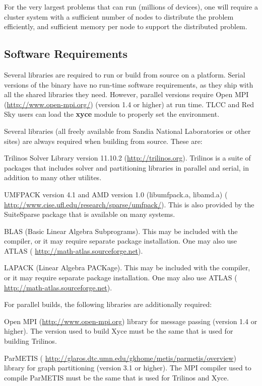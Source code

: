 \documentclass[11pt,report,strict]{SANDreport}
\begin{document}
For the very largest problems that \Xyce{} can run (millions of
devices), one will require a cluster system with a sufficient number
of nodes to distribute the problem efficiently, and sufficient memory
per node to support the distributed problem.  

\subsection{Software Requirements}
Several libraries are required to run \Xyce{} or build \Xyce{} from source on a
platform.  Serial versions of the \Xyce{} binary have no run-time software
requirements, as they ship with all the shared libraries they need.  However,
parallel versions require Open MPI
({\color{XyceDeepRed}\url{http://www.open-mpi.org/}}) (version 1.4 or higher)
at run time.  TLCC and Red Sky users can load the \textbf{xyce} module to properly
set the environment. 

Several libraries (all freely available from Sandia National Laboratories or
other sites) are always required when building \Xyce{} from source.  These are:
\begin{XyceItemize}
\item Trilinos Solver Library version 11.10.2
  ({\color{XyceDeepRed}\url{http://trilinos.org}}).  Trilinos is a suite of
  packages that includes solver and partitioning libraries in parallel and
  serial, in addition to many other utilites.
\item UMFPACK version 4.1 and AMD version 1.0 (libumfpack.a, libamd.a)
  ({\color{XyceDeepRed}
  \url{http://www.cise.ufl.edu/research/sparse/umfpack/}}).  This is also
  provided by the SuiteSparse package that is available on many systems.
\item BLAS (Basic Linear Algebra Subprograms). This may be included with the
  compiler, or it may require separate package installation. One may also use
  ATLAS ({\color{XyceDeepRed} \url{http://math-atlas.sourceforge.net}}).
\item LAPACK (Linear Algebra PACKage). This may be included with the
  compiler, or it may require separate package installation. One may also use
  ATLAS ({\color{XyceDeepRed} \url{http://math-atlas.sourceforge.net}}).
\end{XyceItemize}
For parallel builds, the following libraries are additionally required:
\begin{XyceItemize}
\item Open MPI ({\color{XyceDeepRed}\url{http://www.open-mpi.org}}) library for
  message passing (version 1.4 or higher).  The version used to build Xyce must
  be the same that is used for building Trilinos.
\item ParMETIS ({\color{XyceDeepRed}
  \url{http://glaros.dtc.umn.edu/gkhome/metis/parmetis/overview}}) library for
  graph partitioning (version 3.1 or higher).  The MPI compiler used to compile
  ParMETIS must be the same that is used for Trilinos and Xyce.
\end{XyceItemize}
\end{document}

